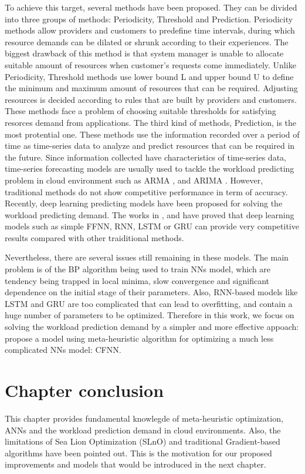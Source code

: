 \documentclass[../main.tex]{subfiles}
\begin{document}
	To achieve this target, several methods have been proposed. They can be divided into three groups of methods: Periodicity, Threshold and Prediction. Periodicity methods allow providers and customers to predefine time intervals, during which resource demands can be dilated or shrunk according to their experiences. The biggest drawback of this method is that system manager is unable to allocate suitable amount of resources when customer's requests come immediately. Unlike Periodicity, Threshold methods use lower bound L and upper bound U to define the minimum and maximum amount of resources that can be required. Adjusting resources is decided according to rules that are built by providers and customers. These methods face a problem of choosing suitable thresholds for satisfying resorces demand from applications. The third kind of methods, Prediction, is the most protential one. These methods use the information recorded over a period of time as time-series data to analyze and predict resources that can be required in the future. Since information collected have characteristics of time-series data, time-series forecasting models are usually used to tackle the workload predicting problem in cloud environment such as ARMA \cite{chen2015efficient}, \cite{yang2013workload} and ARIMA  \cite{calheiros2014workload}. However, traditional methods do not show competitive performance in term of accuracy. Recently, deep learning predicting models have been proposed for solving the workload predicting demand. The works in \cite{shahin2017automatic}, \cite{zhu2017deep} and \cite{tran2018multivariate} have proved that deep learning models such as simple FFNN, RNN, LSTM or GRU can provide very competitive results compared with other traiditional methods.  
	
	Nevertheless, there are several issues still remaining in these models. The main problem is of the BP algorithm being used to train NNs model, which are tendency being trapped in local minima, slow convergence and significant dependence on the initial stage of their parameters. Also, RNN-based models like LSTM and GRU are too complicated that can lead to overfitting, and contain a huge number of parameters to be optimized. Therefore in this work, we focus on solving the workload prediction demand by a simpler and more effective appoach: propose a model using meta-heuristic algorithm for optimizing a much less complicated NNs model: CFNN.

\section{Chapter conclusion}
This chapter provides fundamental knowlegde of meta-heuristic optimization, ANNs and the workload prediction demand in cloud environments. Also, the limitations of Sea Lion Optimization (SLnO) and traditional Gradient-based algorithms have been pointed out. This is the motivation for our proposed improvements and models that would be introduced in the next chapter. 
\end{document}
